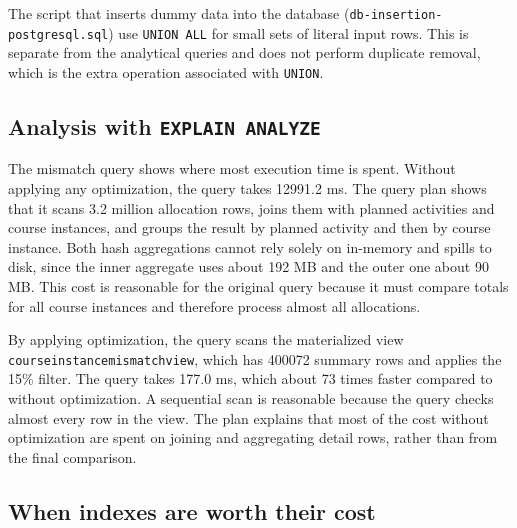 \documentclass[a4paper]{scrartcl}
\renewcommand{\_}{\textunderscore\allowbreak}
\begin{document}
The script that inserts dummy data into the database (\texttt{db-insertion-postgresql.sql}) use \texttt{UNION ALL} for small sets of literal input rows. This is separate from the analytical queries and does not perform duplicate removal, which is the extra operation associated with \texttt{UNION}.


\subsection{Analysis with \texttt{EXPLAIN ANALYZE}}

The mismatch query shows where most execution time is spent. Without applying any optimization, the query takes 12991.2 ms. The query plan shows that it scans 3.2 million allocation rows, joins them with planned activities and course instances, and groups the result by planned activity and then by course instance. Both hash aggregations cannot rely solely on in-memory and spills to disk, since the inner aggregate uses about 192 MB and the outer one about 90 MB. This cost is reasonable for the original query because it must compare totals for all course instances and therefore process almost all allocations.

By applying optimization, the query scans the materialized view \texttt{course\_instance\_mismatch\_view}, which has 400072 summary rows and applies the 15\% filter. The query takes 177.0 ms, which about 73 times faster compared to without optimization. A sequential scan is reasonable because the query checks almost every row in the view. The plan explains that most of the cost without optimization are spent on joining and aggregating detail rows, rather than from the final comparison.

\subsection{When indexes are worth their cost}
\end{document}
